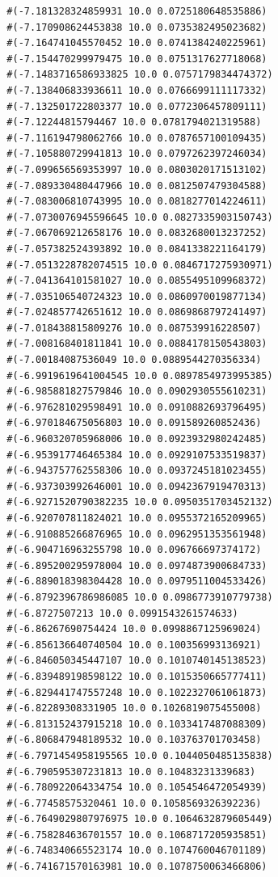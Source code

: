 \documentclass [11pt]{book}
\begin{document}
\begin{itemize}
\begin{figure}
\begin{lrbox}{\boxedverb}
\begin{minipage}{\linewidth}
{\begin{verbatim}
  #(-7.181328324859931 10.0 0.0725180648535886)
  #(-7.170908624453838 10.0 0.0735382495023682)
  #(-7.164741045570452 10.0 0.0741384240225961)
  #(-7.154470299979475 10.0 0.0751317627718068)
  #(-7.1483716586933825 10.0 0.0757179834474372)
  #(-7.138406833936611 10.0 0.0766699111117332)
  #(-7.132501722803377 10.0 0.0772306457809111)
  #(-7.12244815794467 10.0 0.0781794021319588)
  #(-7.116194798062766 10.0 0.0787657100109435)
  #(-7.105880729941813 10.0 0.0797262397246034)
  #(-7.099656569353997 10.0 0.0803020171513102)
  #(-7.089330480447966 10.0 0.0812507479304588)
  #(-7.083006810743995 10.0 0.0818277014224611)
  #(-7.0730076945596645 10.0 0.0827335903150743)
  #(-7.067069212658176 10.0 0.0832680013237252)
  #(-7.057382524393892 10.0 0.0841338221164179)
  #(-7.0513228782074515 10.0 0.0846717275930971)
  #(-7.041364101581027 10.0 0.0855495109968372)
  #(-7.035106540724323 10.0 0.0860970019877134)
  #(-7.024857742651612 10.0 0.0869868797241497)
  #(-7.018438815809276 10.0 0.087539916228507)
  #(-7.008168401811841 10.0 0.0884178150543803)
  #(-7.00184087536049 10.0 0.0889544270356334)
  #(-6.9919619641004545 10.0 0.0897854973995385)
  #(-6.985881827579846 10.0 0.0902930555610231)
  #(-6.976281029598491 10.0 0.0910882693796495)
  #(-6.970184675056803 10.0 0.091589260852436)
  #(-6.960320705968006 10.0 0.0923932980242485)
  #(-6.953917746465384 10.0 0.0929107533519837)
  #(-6.943757762558306 10.0 0.0937245181023455)
  #(-6.937303992646001 10.0 0.0942367919470313)
  #(-6.9271520790382235 10.0 0.0950351703452132)
  #(-6.920707811824021 10.0 0.0955372165209965)
  #(-6.910885266876965 10.0 0.0962951353561948)
  #(-6.904716963255798 10.0 0.096766697374172)
  #(-6.895200295978004 10.0 0.0974873900684733)
  #(-6.889018398304428 10.0 0.0979511004533426)
  #(-6.8792396786986085 10.0 0.0986773910779738)
  #(-6.8727507213 10.0 0.0991543261574633)
  #(-6.86267690754424 10.0 0.0998867125969024)
  #(-6.856136640740504 10.0 0.100356993136921)
  #(-6.846050345447107 10.0 0.1010740145138523)
  #(-6.839489198598122 10.0 0.1015350665777411)
  #(-6.829441747557248 10.0 0.1022327061061873)
  #(-6.82289308331905 10.0 0.1026819075455008)
  #(-6.813152437915218 10.0 0.1033417487088309)
  #(-6.806847948189532 10.0 0.103763701703458)
  #(-6.7971454958195565 10.0 0.1044050485135838)
  #(-6.790595307231813 10.0 0.10483231339683)
  #(-6.780922064334754 10.0 0.1054546472054939)
  #(-6.77458575320461 10.0 0.1058569326392236)
  #(-6.7649029807976975 10.0 0.1064632879605449)
  #(-6.758284636701557 10.0 0.1068717205935851)
  #(-6.748340665523174 10.0 0.1074760046701189)
  #(-6.741671570163981 10.0 0.1078750063466806)

\end{verbatim}}
\end{minipage}
\end{lrbox}
\end{figure}
\end{itemize}
\end{document}

